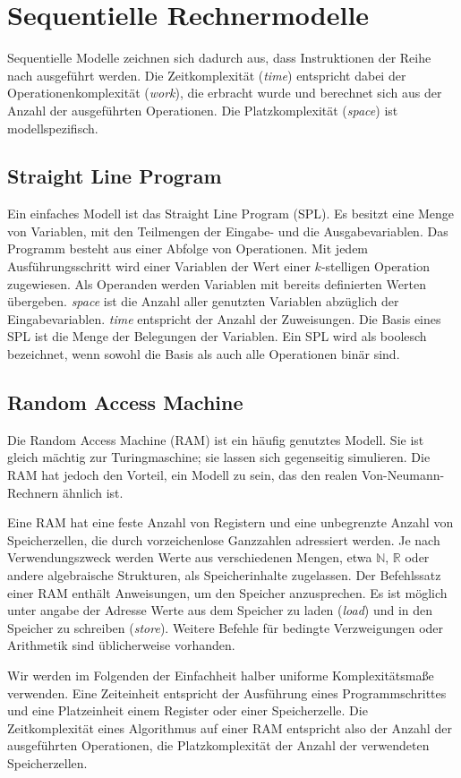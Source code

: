 \section{Sequentielle Rechnermodelle}
Sequentielle Modelle zeichnen sich dadurch aus, dass Instruktionen der Reihe nach ausgeführt werden.
Die Zeitkomplexität (\emph{time}) entspricht dabei der Operationenkomplexität (\emph{work}), die erbracht wurde und berechnet sich aus der Anzahl der ausgeführten Operationen.
Die Platzkomplexität (\emph{space}) ist modellspezifisch.


\subsection{Straight Line Program}
Ein einfaches Modell ist das Straight Line Program (SPL).
Es besitzt eine Menge von Variablen, mit den Teilmengen der Eingabe- und die Ausgabevariablen.
Das Programm besteht aus einer Abfolge von Operationen.
Mit jedem Ausführungsschritt wird einer Variablen der Wert einer $k$-stelligen Operation zugewiesen.
Als Operanden werden Variablen mit bereits definierten Werten übergeben.
\emph{space} ist die Anzahl aller genutzten Variablen abzüglich der Eingabevariablen.
\emph{time} entspricht der Anzahl der Zuweisungen.
Die Basis eines SPL ist die Menge der Belegungen der Variablen.
Ein SPL wird als boolesch bezeichnet, wenn sowohl die Basis als auch alle Operationen binär sind.
\cite[S. 9]{reif}


\subsection{Random Access Machine}
Die Random Access Machine (RAM) ist ein häufig genutztes Modell.
Sie ist gleich mächtig zur Turingmaschine; sie lassen sich gegenseitig simulieren.
Die RAM hat jedoch den Vorteil, ein Modell zu sein, das den realen Von-Neumann-Rechnern ähnlich ist.

Eine RAM hat eine feste Anzahl von Registern und eine unbegrenzte Anzahl von Speicherzellen, die durch vorzeichenlose Ganzzahlen adressiert werden.
Je nach Verwendungszweck werden Werte aus verschiedenen Mengen, etwa $\mathbb{N}$, $\mathbb{R}$ oder andere algebraische Strukturen, als Speicherinhalte zugelassen.
Der Befehlssatz einer RAM enthält Anweisungen, um den Speicher anzusprechen.
Es ist möglich unter angabe der Adresse Werte aus dem Speicher zu laden (\emph{load}) und in den Speicher zu schreiben (\emph{store}).
Weitere Befehle für bedingte Verzweigungen oder Arithmetik sind üblicherweise vorhanden.

Wir werden im Folgenden der Einfachheit halber uniforme Komplexitätsmaße verwenden.
Eine Zeiteinheit entspricht der Ausführung eines Programmschrittes
und eine Platzeinheit einem Register oder einer Speicherzelle.
Die Zeitkomplexität eines Algorithmus auf einer RAM entspricht also der Anzahl der ausgeführten Operationen, die Platzkomplexität der Anzahl der verwendeten Speicherzellen.
\cite[S. 9ff.]{reif}
\cite[S. 184ff.]{fgi2}
